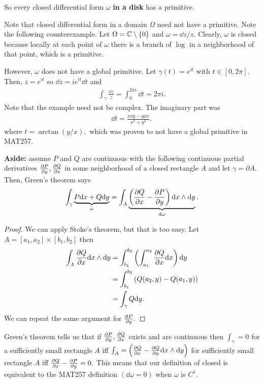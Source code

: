 \documentclass[a4paper,12pt]{article}
\begin{document}
So every closed differential form $\omega$ \textbf{in a disk} has a primitive. 

Note that closed differential form in a domain $\Omega$ need not have a primitive. Note the following counterexample. Let $\Omega=\mathbb{C}\setminus\{0\}$ and $\omega=\dd z/z.$ Clearly, $\omega$ is closed because locally at each point of $\omega$ there is a branch of $\log$ in a neighborhood of that point, which is a primitive.

However, $\omega$ does not have a global primitive. Let $\gamma(t)=e^{it}$ with $t\in[0,2\pi].$ Then, $z=e^{it}$ so $\dd z=ie^{it}\dd t$ and \begin{align}
    \int_\gamma\frac{\dd z}{z}=\int_0^{2\pi i}\dd t=2\pi i.
\end{align}
Note that the example need not be complex. The imaginary part was \begin{align}
    \dd t=\frac{x\dd y-y\dd x}{x^2+y^2},
\end{align}
where $t=\arctan(y/x),$ which was proven to not have a global primitive in MAT257.

\begin{theorem}
    \textbf{Aside:} assume $P$ and $Q$ are continuous with the following continuous partial derivatives $\partialderivative{P}{y},\partialderivative{Q}{x}$ in some neighborhood of a closed rectangle $A$ and let $\gamma=\partial A.$ Then, Green's theorem says \begin{align}
        \int_\gamma\underbrace{P\dd x+Q\dd y}_{\omega}=\int_A\underbrace{\left(\partialderivative{Q}{x}-\partialderivative{P}{y}\right)\dd x\wedge\dd y}_{\dd\omega}.
    \end{align} 
    \begin{proof}
        We can apply Stoke's theorem, but that is too easy. Let $A=[a_1,a_2]\times[b_1,b_2]$ then \begin{align}
            \int_A\partialderivative{Q}{x}\dd x\wedge\dd y&=\int_{b_1}^{b_2}\left(\int_{a_1}^{a_2}\partialderivative{Q}{x}\dd x\right)\dd y\\
            &=\int_{b_1}^{b_2}\left(Q(a_2,y)-Q(a_1,y)\right)\\
            &=\int_\gamma Q\dd y.
        \end{align}
        We can repeat the same argument for $\partialderivative{P}{y}.$
    \end{proof}
\end{theorem}
Green's theorem tells us that if $\partialderivative{P}{y},\partialderivative{Q}{x}$ exists and are continuous then $\int_\gamma=0$ for a sufficiently small rectangle $A$ iff $\int_A=\left(\partialderivative{Q}{x}-\partialderivative{Q}{y}\dd x\wedge\dd y\right)$ for sufficiently small rectangle $A$ iff $\partialderivative{Q}{x}-\partialderivative{P}{y}=0.$ This means that our definition of closed is equivalent to the MAT257 definition $(\dd\omega=0)$ when $\omega$ is $C^1.$
\end{document}
